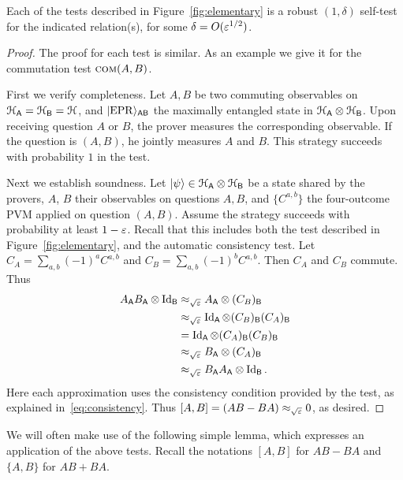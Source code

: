 \begin{lemma}\label{lem:elementary}
Each of the tests described in Figure~\ref{fig:elementary} is a robust $(1,\delta)$ self-test for the indicated relation(s), for some $\delta = O(\varepsilon^{1/2})$. 
\end{lemma}

\begin{proof}
The proof for each test is similar. As an example we give it for the commutation test $\textsc{com}(A,B)$. 

First we verify completeness. Let $A,B$ be two commuting observables on $\mathcal{H}_{{\textsf{A}}} = \mathcal{H}_{{\textsf{B}}} = \mathcal{H}$, and $|{\rm EPR}\rangle_{{\textsf{AB}}}$ the maximally entangled state in $\mathcal{H}_{\textsf{A}}\otimes \mathcal{H}_{\textsf{B}}$. Upon receiving question $A$ or $B$, the prover measures the corresponding observable. If the question is $(A,B)$, he jointly measures $A$ and $B$. This strategy succeeds with probability $1$ in the test. 

Next we establish soundness. Let $|\psi\rangle \in \mathcal{H}_{{\textsf{A}}}\otimes \mathcal{H}_{\textsf{B}}$ be a state shared by the provers, $A$, $B$ their observables on questions $A,B$, and $\{C^{a,b}\}$ the four-outcome PVM applied on question $(A,B)$. Assume the strategy succeeds with probability at least $1-\varepsilon$. Recall that this includes both the test described in Figure~\ref{fig:elementary}, and the automatic consistency test. Let $C_A = \sum_{a,b} (-1)^a C^{a,b}$ and $C_B = \sum_{a,b} (-1)^b C^{a,b}$. Then $C_A$ and $C_B$ commute. Thus
\begin{align*}
A_{\textsf{A}} B_{\textsf{A}} \otimes \mathop{\rm Id}\nolimits_{\textsf{B}}
&\approx_{\sqrt{\varepsilon}} A_{\textsf{A}} \otimes (C_B)_{\textsf{B}}\\
&\approx_{\sqrt{\varepsilon}} \mathop{\rm Id}\nolimits_{\textsf{A}} \otimes (C_B)_{\textsf{B}}(C_A)_{\textsf{B}}\\
&=  \mathop{\rm Id}\nolimits_{\textsf{A}} \otimes (C_A)_{\textsf{B}}(C_B)_{\textsf{B}}\\
&\approx_{\sqrt{\varepsilon}} B_{\textsf{A}} \otimes (C_A)_{\textsf{B}}\\
&\approx_{\sqrt{\varepsilon}} B_{\textsf{A}} A_{\textsf{A}} \otimes \mathop{\rm Id}\nolimits_{\textsf{B}}.
\end{align*}
Here each approximation uses the consistency condition provided by the test, as explained in~\eqref{eq:consistency}. Thus $[A,B] = (AB-BA) \approx_{\sqrt{\varepsilon}} 0$, as desired. 
\end{proof}

We will often make use of the following simple lemma, which expresses an application of the above tests. Recall the notations $[A,B]$ for $AB-BA$ and $\{A,B\}$ for $AB+BA$. 


